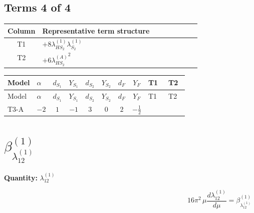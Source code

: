 \documentclass[8pt]{article}
\begin{document}
\begin{landscape}
\subsection*{Terms 4 of 4}
\begin{center}
\begin{tabular}{@{}c >{\raggedright\arraybackslash}p{0.82\linewidth}@{}}
\toprule
Column & Representative term structure \\
\midrule
T1 & \(\displaystyle +8 {\lambda_{HS_2}^{(1)}} {\lambda_{S_2}^{(1)}}\) \\
\midrule
T2 & \(\displaystyle +6 {\lambda_{HS_2}^{(A)}}^2\) \\
\midrule
\bottomrule
\end{tabular}
\end{center}
\smallskip
\tiny
\begin{longtable}{@{}llcccccc >{\raggedright\arraybackslash}p{0.21\linewidth} >{\raggedright\arraybackslash}p{0.21\linewidth}@{}}
\toprule
Model & $\alpha$ & $d_{S_1}$ & $Y_{S_1}$ & $d_{S_2}$ & $Y_{S_2}$ & $d_F$ & $Y_F$ & T1 & T2 \\
\midrule
\endfirsthead
\toprule
Model & $\alpha$ & $d_{S_1}$ & $Y_{S_1}$ & $d_{S_2}$ & $Y_{S_2}$ & $d_F$ & $Y_F$ & T1 & T2 \\
\midrule
\endhead
T3-A & $-2$ & $1$ & $-1$ & $3$ & $0$ & $2$ & $-\frac{1}{2}$ & \scriptsize\adjustbox{max width=\linewidth}{$\begin{gathered} +8 {\lambda_{HS_2}^{(1)}} {\lambda_{S_2}^{(1)}}\end{gathered}$} & \scriptsize\adjustbox{max width=\linewidth}{$\begin{gathered} +6 {\lambda_{HS_2}^{(A)}}^2\end{gathered}$} \\
\midrule
\bottomrule
\end{longtable}
\clearpage
\section*{$\beta_{\lambda_{12}^{(1)}}^{(1)}$}
\noindent\textbf{Quantity: }$\lambda_{12}^{(1)}$\par\smallskip
\[16\pi^2\,\mu\frac{d \lambda_{12}^{(1)}}{d\mu}=\beta_{\lambda_{12}^{(1)}}^{(1)}\]

\end{landscape}
\end{document}
